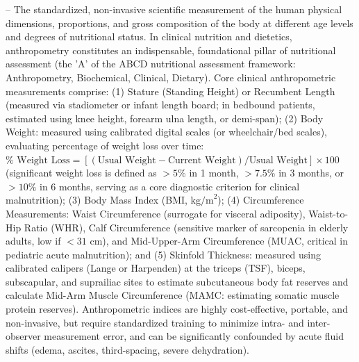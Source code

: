 -- The standardized, non-invasive scientific measurement of the human physical dimensions, proportions, and gross composition of the body at different age levels and degrees of nutritional status. In clinical nutrition and dietetics, anthropometry constitutes an indispensable, foundational pillar of nutritional assessment (the 'A' of the ABCD nutritional assessment framework: Anthropometry, Biochemical, Clinical, Dietary). Core clinical anthropometric measurements comprise: (1) Stature (Standing Height) or Recumbent Length (measured via stadiometer or infant length board; in bedbound patients, estimated using knee height, forearm ulna length, or demi-span); (2) Body Weight: measured using calibrated digital scales (or wheelchair/bed scales), evaluating percentage of weight loss over time: $\% \text{ Weight Loss} = [(\text{Usual Weight} - \text{Current Weight}) / \text{Usual Weight}] \times 100$ (significant weight loss is defined as $>5\%$ in 1 month, $>7.5\%$ in 3 months, or $>10\%$ in 6 months, serving as a core diagnostic criterion for clinical malnutrition); (3) Body Mass Index (BMI, $\text{kg/m}^2$); (4) Circumference Measurements: Waist Circumference (surrogate for visceral adiposity), Waist-to-Hip Ratio (WHR), Calf Circumference (sensitive marker of sarcopenia in elderly adults, low if $<31$ cm), and Mid-Upper-Arm Circumference (MUAC, critical in pediatric acute malnutrition); and (5) Skinfold Thickness: measured using calibrated calipers (Lange or Harpenden) at the triceps (TSF), biceps, subscapular, and suprailiac sites to estimate subcutaneous body fat reserves and calculate Mid-Arm Muscle Circumference (MAMC: estimating somatic muscle protein reserves). Anthropometric indices are highly cost-effective, portable, and non-invasive, but require standardized training to minimize intra- and inter-observer measurement error, and can be significantly confounded by acute fluid shifts (edema, ascites, third-spacing, severe dehydration).

